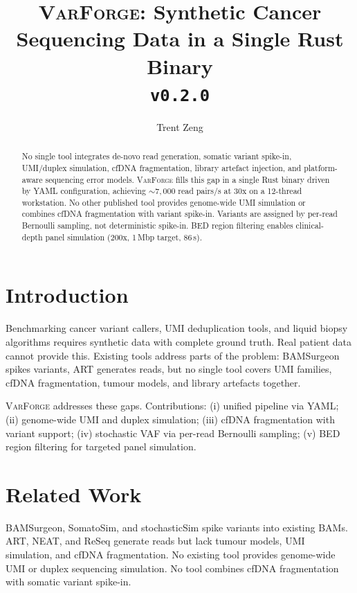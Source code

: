 \documentclass[10pt, twocolumn]{article}
\newcommand{\varforge}{\textsc{VarForge}\xspace}
\begin{document}
\title{\varforge: Synthetic Cancer Sequencing Data in a Single Rust Binary\\[0.2ex]
       \small\texttt{v0.2.0}}
\author{Trent Zeng}
\date{}
\maketitle

\begin{abstract}
\noindent
No single tool integrates de-novo read generation, somatic variant spike-in, UMI/duplex simulation, cfDNA fragmentation, library artefact injection, and platform-aware sequencing error models.
\varforge{} fills this gap in a single Rust binary driven by YAML configuration, achieving ${\sim}7{,}000$ read pairs/s at 30x on a 12-thread workstation.
No other published tool provides genome-wide UMI simulation or combines cfDNA fragmentation with variant spike-in.
Variants are assigned by per-read Bernoulli sampling, not deterministic spike-in.
BED region filtering enables clinical-depth panel simulation (200x, 1\,Mbp target, 86\,s).
\end{abstract}

\section{Introduction}

Benchmarking cancer variant callers, UMI deduplication tools, and liquid biopsy algorithms requires synthetic data with complete ground truth.
Real patient data cannot provide this.
Existing tools address parts of the problem: BAMSurgeon\autocite{ewing2015bamsurgeon} spikes variants, ART\autocite{huang2012art} generates reads, but no single tool covers UMI families, cfDNA fragmentation, tumour models, and library artefacts together.

\varforge{} addresses these gaps.
Contributions: (i) unified pipeline via YAML; (ii) genome-wide UMI and duplex simulation; (iii) cfDNA fragmentation with variant support; (iv) stochastic VAF via per-read Bernoulli sampling; (v) BED region filtering for targeted panel simulation.

\section{Related Work}

BAMSurgeon\autocite{ewing2015bamsurgeon}, SomatoSim\autocite{kuhnemund2017somatomsim}, and stochasticSim\autocite{osullivan2023stochasticsim} spike variants into existing BAMs.
ART\autocite{huang2012art}, NEAT\autocite{stephens2016neat}, and ReSeq\autocite{schmeing2021reseq} generate reads but lack tumour models, UMI simulation, and cfDNA fragmentation.
No existing tool provides genome-wide UMI or duplex sequencing simulation.
No tool combines cfDNA fragmentation with somatic variant spike-in.
\end{document}
